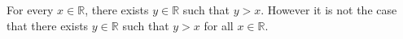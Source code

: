 For every $x \in \mathbb{R}$, there exists $y \in \mathbb{R}$ such that $y > x$.
However it is not the case that there exists $y \in \mathbb{R}$ such that $y > x$ for all $x \in \mathbb{R}$.